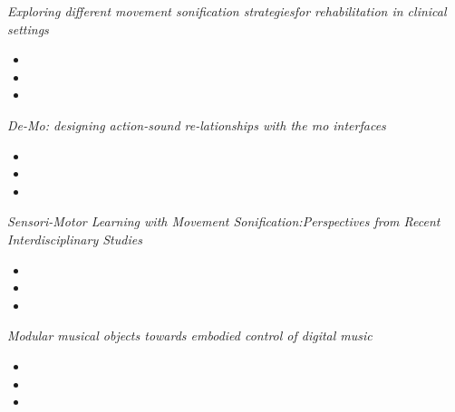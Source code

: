 \documentclass[11pt]{article}
\begin{document}
\textit{Exploring different movement sonification strategiesfor rehabilitation in clinical settings} \citep{bevilacqua_exploring_2018}
\begin{itemize}
    \item 
    \item 
    \item 
\end{itemize}

\textit{De-Mo: designing action-sound re-lationships with the mo interfaces} \citep{bevilacqua_-mo_2013}
\begin{itemize}
    \item 
    \item 
    \item 
\end{itemize}

\textit{Sensori-Motor Learning with Movement Sonification:Perspectives from Recent Interdisciplinary Studies} \citep{bevilacqua_sensori-motor_2016}
\begin{itemize}
    \item 
    \item 
    \item 
\end{itemize}

\textit{Modular musical objects towards embodied control of digital music} \citep{rasamimanana_modular_2011}
\begin{itemize}
    \item 
    \item 
    \item 
\end{itemize}


\newpage


\end{document}
